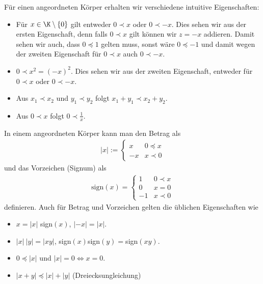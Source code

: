 \documentclass[letterpaper,10pt,english]{jupyterBook}
\begin{document}
Für einen angeordneten Körper erhalten wir verschiedene intuitive Eigenschaften:
\begin{itemize}
\item {} 
Für \(x \in \K \setminus \{0\}\) gilt entweder \(0 \prec x\) oder \(0 \prec -x\). Dies sehen wir aus der ersten Eigenschaft, denn falls \(0 \prec x\) gilt können wir \(z=-x\) addieren. Damit sehen wir auch, dass \( 0 \preceq 1\) gelten muss, sonst wäre \(0 \preceq -1\) und damit wegen der zweiten Eigenschaft für \(0 \prec x \) auch \(0 \prec -x\).

\item {} 
\(0 \prec x^2 = (-x)^2\). Dies sehen wir aus der zweiten Eigenschaft, entweder für \(0 \prec x\) oder \(0 \prec -x\).

\item {} 
Aus \(x_1 \prec x_2\) und \(y_1 \prec y_2\) folgt \(x_1 + y_1 \prec x_2 + y_2\).

\item {} 
Aus \(0 \prec x\) folgt \(0 \prec \frac{1}x\).

\end{itemize}

In einem angeordneten Körper kann man den Betrag als
\begin{equation*}
\begin{split}\vert x \vert := \left\{ \begin{array}{rl} x & 0 \preceq x \\ -x & x \prec 0 \end{array} \right.\end{split}
\end{equation*}
und das Vorzeichen (Signum) als
\begin{equation*}
\begin{split}\text{sign}(x) =  \left\{ \begin{array}{rl} 1 & 0 \prec  x \\ 0 & x =0\\-1 & x \prec 0 \end{array}\right.\end{split}
\end{equation*}
definieren. Auch für Betrag und Vorzeichen gelten die üblichen Eigenschaften wie
\begin{itemize}
\item {} 
\(x = |x|\) sign\((x)\), \(|-x|=|x|\).

\item {} 
\(|x|~|y|=|xy|\), sign\((x)\)sign\((y) = \)sign\((xy)\).

\item {} 
\(0 \preceq |x|\) und \(|x|=0 \Leftrightarrow x =0\).

\item {} 
\(|x+y| \preceq |x|+|y|\) (Dreiecksungleichung)

\end{itemize}
\end{document}
